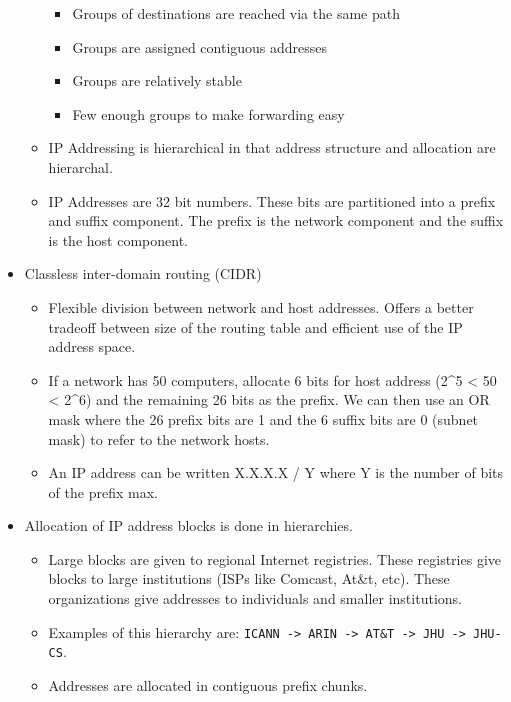 \begin{itemize}
\begin{itemize}
    \begin{itemize}
    \tightlist
    \item
      Groups of destinations are reached via the same path
    \item
      Groups are assigned contiguous addresses
    \item
      Groups are relatively stable
    \item
      Few enough groups to make forwarding easy
    \end{itemize}
  \item
    IP Addressing is hierarchical in that address structure and
    allocation are hierarchal.
  \item
    IP Addresses are 32 bit numbers. These bits are partitioned into a
    prefix and suffix component. The prefix is the network component and
    the suffix is the host component.
  \end{itemize}
\item
  Classless inter-domain routing (CIDR)

  \begin{itemize}
  \tightlist
  \item
    Flexible division between network and host addresses. Offers a
    better tradeoff between size of the routing table and efficient use
    of the IP address space.
  \item
    If a network has 50 computers, allocate 6 bits for host address
    (2\^{}5 \textless{} 50 \textless{} 2\^{}6) and the remaining 26 bits
    as the prefix. We can then use an OR mask where the 26 prefix bits
    are 1 and the 6 suffix bits are 0 (subnet mask) to refer to the
    network hosts.
  \item
    An IP address can be written X.X.X.X / Y where Y is the number of
    bits of the prefix max.
  \end{itemize}
\item
  Allocation of IP address blocks is done in hierarchies.

  \begin{itemize}
  \tightlist
  \item
    Large blocks are given to regional Internet registries. These
    registries give blocks to large institutions (ISPs like Comcast,
    At\&t, etc). These organizations give addresses to individuals and
    smaller institutions.
  \item
    Examples of this hierarchy are:
    \texttt{ICANN\ -\textgreater{}\ ARIN\ -\textgreater{}\ AT\&T\ -\textgreater{}\ JHU\ -\textgreater{}\ JHU-CS}.
  \item
    Addresses are allocated in contiguous prefix chunks.


\end{itemize}
\end{itemize}

